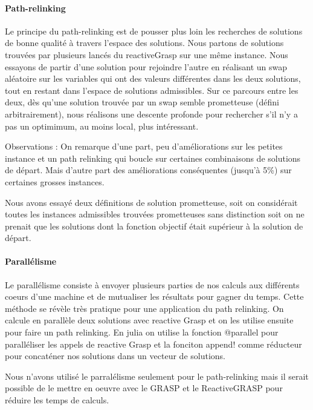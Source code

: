 \paragraph {Path-relinking} \noindent

Le principe du path-relinking\cite{path} est de pousser plus loin les recherches de solutions de bonne qualité à travers l'espace des solutions. Nous partons de solutions trouvées par plusieurs lancés du reactiveGrasp sur une même instance. Nous essayons de partir d'une solution pour rejoindre l'autre en réalisant un swap aléatoire sur les variables qui ont des valeurs différentes dans les deux solutions, tout en restant dans l'espace de solutions admissibles. Sur ce parcours entre les deux, dès qu'une solution trouvée par un swap semble prometteuse (défini arbitrairement), nous réalisons une descente profonde pour rechercher s'il n'y a pas un optimimum, au moins local, plus intéressant.

Observations :  On remarque d'une part, peu d'améliorations sur les petites instance et un path relinking qui boucle sur certaines combinaisons de solutions de départ. Mais d'autre part des améliorations conséquentes (jusqu'à 5\%) sur certaines grosses instances.

Nous avons essayé deux définitions de solution prometteuse, soit on considérait toutes les instances admissibles trouvées prometteuses sans distinction soit on ne prenait que les solutions dont la fonction objectif était supérieur à la solution de départ.

\paragraph {Parallélisme} \noindent


Le parallélisme consiste à envoyer plusieurs parties de nos calculs aux différents coeurs d'une machine et de mutualiser les résultats pour gagner du temps.
Cette méthode se révèle très pratique pour une application du path relinking. On calcule en parallèle deux solutions avec reactive Grasp et on les utilise ensuite pour faire un path relinking.
En julia on utilise la fonction @parallel pour paralléliser les appels de reactive Grasp et la fonciton append! comme réducteur pour concaténer nos solutions dans un vecteur de solutions.

Nous n'avons utilisé le parralélisme seulement pour le path-relinking mais il serait possible de le mettre en oeuvre avec le GRASP et le ReactiveGRASP pour réduire les temps de calculs.

